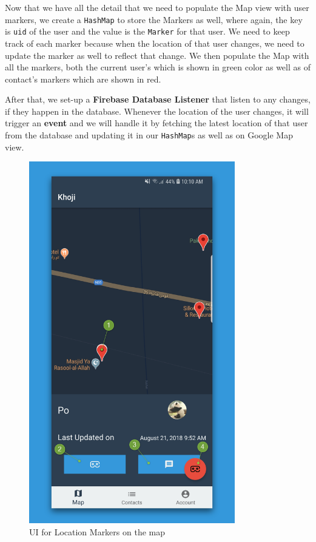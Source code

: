 Now that we have all the detail that we need to populate the Map view with user markers, we create a \texttt{HashMap} to store the Markers as well, where again, the key is \texttt{uid} of the user and the value is the \texttt{Marker} for that user. We need to keep track of each marker because when the location of that user changes, we need to update the marker as well to reflect that change. We then populate the Map with all the markers, both the current user's which is shown in green color as well as of contact's markers which are shown in red.

After that, we set-up a \textbf{Firebase Database Listener} that listen to any changes, if they happen in the database. Whenever the location of the user changes, it will trigger an \textbf{event} and we will handle it by fetching the latest location of that user from the database and updating it in our \texttt{HashMap}s as well as on Google Map view.

\begin{figure}
	\centering
		\includegraphics[width=0.80\textwidth]{images/khoji_location_markers_2.png}
	\caption{UI for Location Markers on the map}
	\label{fig:khoji_location_markers}
\end{figure}

